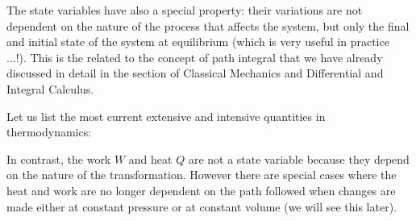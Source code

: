 	The state variables have also a special property: their variations are not dependent on the nature of the process that affects the system, but only the final and initial state of the system at equilibrium (which is very useful in practice ...!). This is the related to the concept of path integral that we have already discussed in detail in the section of Classical Mechanics and Differential and Integral Calculus.

	Let us list the most current extensive and intensive quantities in thermodynamics:
	
	In contrast, the work $W$ and heat $Q$ are not a state variable because they depend on the nature of the transformation. However there are special cases where the heat and work are no longer dependent on the path followed when changes are made either at constant pressure or at constant volume (we will see this later).
	
